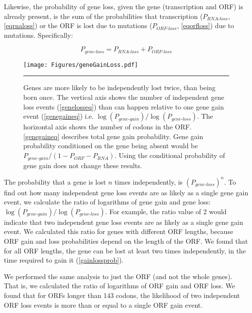 \documentclass[12pt,a4paper]{article}
\begin{document}
Likewise, the probability of gene loss, given the gene (transcription and ORF) is already present, is the sum of the probabilities that transcription ($P_\textit{RNA-loss}$, \autoref{eqrnaloss}) or the ORF is lost due to mutations ($P_\textit{ORF-loss}$, \autoref{eqorfloss}) due to mutations. Specifically:

\begin{equation}
P_\textit{gene-loss} = P_\textit{RNA-loss} + P_\textit{ORF-loss}
\label{genelosseq}
\end{equation}

\begin{figure}[!t]
\centering
\texttt{[image: Figures/geneGainLoss.pdf]}
\caption{Genes are more likely to be independently lost twice, than being born once. The vertical axis shows the number of independent gene loss events (\autoref{genelosseq}) than can happen relative to one gene gain event (\autoref{genegaineq}) i.e. $\log(P_\textit{gene-gain})/\log(P_\textit{gene-loss})$. The horizontal axis shows the number of codons in the ORF. \autoref{genegaineq} describes total gene gain probability. Gene gain probability conditioned on the gene being absent would be $P_\textit{gene-gain}/(1-P_\textit{ORF} - P_\textit{RNA})$. Using the conditional probability of gene gain does not change these results.}
\label{gainlossprob}
\vspace{1ex}
\hrule
\end{figure}

The probability that a gene is lost $n$ times independently, is $(P_\textit{gene-loss})^{n}$. To find out how many independent gene loss events are as likely as a single gene gain event, we calculate the ratio of logarithms of gene gain and gene loss: $\log(P_\textit{gene-gain})/\log(P_\textit{gene-loss})$. For example, the ratio value of 2 would indicate that two independent gene loss events are as likely as a single gene gain event. We calculated this ratio for genes with different ORF lengths, because ORF gain and loss probabilities depend on the length of the ORF. We found that for all ORF lengths, the gene can be lost at least two times independently, in the time required to gain it (\autoref{gainlossprob}). 

We performed the same analysis to just the ORF (and not the whole genes). That is, we calculated the ratio of logarithms of ORF gain and ORF loss. We found that for ORFs longer than 143 codons, the likelihood of two independent ORF loss events is more than or equal to a single ORF gain event. 
\end{document}
